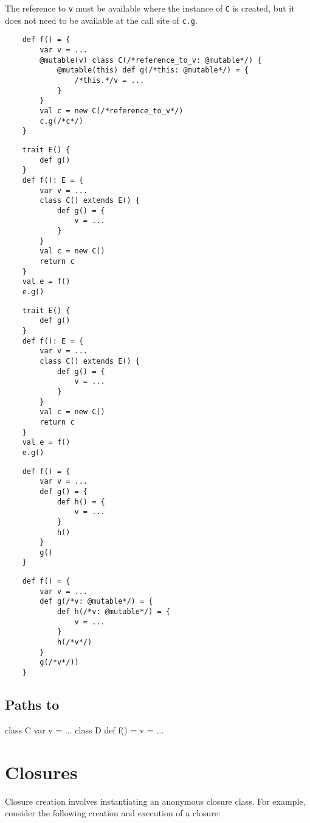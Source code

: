 \documentclass[letterpaper,11pt]{article}
\newcommand{\code}[1]{\lstinline$#1$}
\begin{document}
The reference to \code{v} must be available where the instance of \code{C} is created,
but it does not need to be available at the call site of \code{c.g}.

\begin{lstlisting}
	def f() = {
		var v = ...
		@mutable(v) class C(/*reference_to_v: @mutable*/) {
			@mutable(this) def g(/*this: @mutable*/) = {
				/*this.*/v = ...
			}
		}
		val c = new C(/*reference_to_v*/)
		c.g(/*c*/)
	}
\end{lstlisting}


\begin{lstlisting}
	trait E() {
		def g()
	}
	def f(): E = {
		var v = ...
		class C() extends E() {
			def g() = {
				v = ...
			}
		}
		val c = new C()
		return c
	}
	val e = f()
	e.g()
\end{lstlisting}


\begin{lstlisting}
	trait E() {
		def g()
	}
	def f(): E = {
		var v = ...
		class C() extends E() {
			def g() = {
				v = ...
			}
		}
		val c = new C()
		return c
	}
	val e = f()
	e.g()
\end{lstlisting}





\begin{lstlisting}
	def f() = {
		var v = ...
		def g() = {
			def h() = {
				v = ...
			}
			h()
		}
		g()
	}
\end{lstlisting}

\begin{lstlisting}
	def f() = {
		var v = ...
		def g(/*v: @mutable*/) = {
			def h(/*v: @mutable*/) = {
				v = ...
			}
			h(/*v*/)
		}
		g(/*v*/))
	}
\end{lstlisting}



\subsection{Paths to }

	class C {
		var v = ...
		class D {
			def f() = {
				v = ...
			}
		}
	}

\section{Closures}

Closure creation involves instantiating an anonymous closure class.
For example, consider the following creation and execution of a closure:
\end{document}
